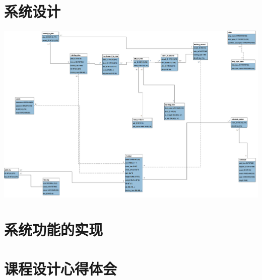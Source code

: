\section{系统设计}

\newpage

\newpage
\includegraphics[width=\textwidth]{figure/relation-schema}


\section{系统功能的实现}

\section{课程设计心得体会}











